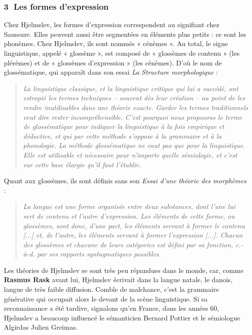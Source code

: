 \subsubsection*{\textcircled{\scriptsize 3} Les formes d’expression}
Chez Hjelmslev, les formes d’expression correspondent au signifiant chez Saussure. Elles peuvent aussi être segmentées en éléments plus petits : ce sont les phonèmes. Chez Hjelmslev, ils sont nommés « cénèmes ». Au total, le signe linguistique, appelé « glossème », est composé de « glossèmes de contenu » (les plérèmes) et de « glossèmes d’expression » (les cénèmes). D’où le nom de glossématique, qui apparaît dans son essai \textit{La Structure morphologique} :
\begin{quote}\small\itshape
La linguistique classique, et la linguistique critique qui lui a succédé, ont estropié les termes techniques -- souvent dès leur création -- au point de les rendre inutilisables dans une théorie exacte. Garder les termes traditionnels veut dire rester incompréhensible. C’est pourquoi nous proposons le terme de glossématique pour indiquer la linguistique à la fois empirique et déductive, et qui par cette méthode s’oppose à la grammaire et à la phonologie. La méthode glossématique ne vaut pas que pour la linguistique. Elle est utilisable et nécessaire pour n’importe quelle sémiologie, et c’est sur cette base élargie qu’il faut l’établir.
\end{quote}
Quant aux glossèmes, ils sont définis sans son \textit{Essai d’une théorie des morphèmes} :
\begin{quote}\small\itshape
La langue est une forme organisée entre deux substances, dont l’une lui sert de contenu et l’autre d’expression. Les éléments de cette forme, ou glossèmes, sont donc, d’une part, les éléments servant à former le contenu [...] et, de l’autre, les éléments servant à former l’expression [...]. Chacun des glossèmes et chacune de leurs catégories est défini par sa fonction, c.-à-d. par ses rapports syntagmatiques possibles.
\end{quote}
Les théories de Hjelmslev se sont très peu répandues dans le monde, car, comme \textbf{Rasmus Rask} avant lui, Hjelmslev écrivait dans la langue natale, le danois, langue de très faible diffusion. Comble de malchance, c’est la grammaire générative qui occupait alors le devant de la scène linguistique. Si sa reconnaissance a été tardive, signalons qu’en France, dans les années 60, Hjelmslev a beaucoup influencé le sémanticien Bernard Pottier et le sémiologue Algirdas Julien Greimas.

